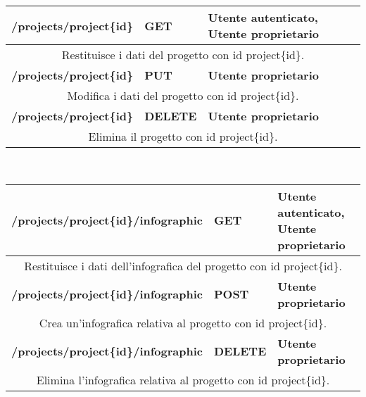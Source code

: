 \begin{table}[H]
	\begin{tabular}{|p{}|p{}|p{}|}
		\toprule
		\textbf{/projects/project\{id\}} & \textbf{GET} & \textbf{Utente autenticato, Utente proprietario} \\ \midrule
		\multicolumn{3}{|c|}{Restituisce i dati del progetto con id project\{id\}.} \\ \midrule
		\textbf{/projects/project\{id\}} & \textbf{PUT} & \textbf{Utente proprietario} \\ \midrule
		\multicolumn{3}{|c|}{Modifica i dati del progetto con id project\{id\}.} \\ \midrule
		\textbf{/projects/project\{id\}} & \textbf{DELETE} & \textbf{Utente proprietario} \\ \midrule
		\multicolumn{3}{|c|}{Elimina il progetto con id project\{id\}.} \\
		\bottomrule
	\end{tabular}
	\\ \par\bigskip
	
	\begin{tabular}{|p{}|p{}|p{}|}
		\toprule
		\textbf{/projects/project\{id\}/infographic} & \textbf{GET} & \textbf{Utente autenticato, Utente proprietario} \\ \midrule
		\multicolumn{3}{|c|}{Restituisce i dati dell'infografica del progetto con id project\{id\}.} \\
		\bottomrule
		\textbf{/projects/project\{id\}/infographic} & \textbf{POST} & \textbf{Utente proprietario} \\ \midrule
		\multicolumn{3}{|c|}{Crea un'infografica relativa al progetto con id project\{id\}.} \\
		\bottomrule
		\textbf{/projects/project\{id\}/infographic} & \textbf{DELETE} & \textbf{Utente proprietario} \\ \midrule
		\multicolumn{3}{|c|}{Elimina l'infografica relativa al progetto con id project\{id\}.} \\
		\bottomrule
	\end{tabular}\\
	\par\bigskip
	

\end{table}
